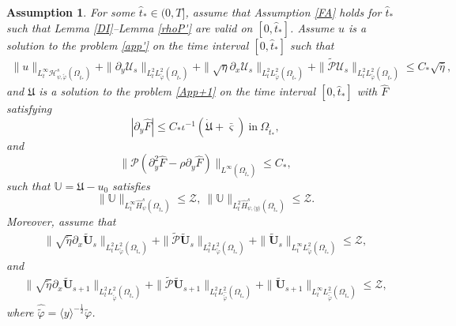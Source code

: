\documentclass[10pt,a4paper]{amsart}
\newtheorem{assumption}{Assumption}
\newcommand\y{{{\langle y \rangle}}}
\begin{document}
\begin{assumption}\label{peA}
For some $\hat{t}_{*}\in(0,T]$, assume that
Assumption \ref{FA} holds for $\hat{t}_{*}$ such that  Lemma \ref{DI}--Lemma \ref{rhoP'} are valid on $[0,\hat{t}_{*}]$. Assume $u$ is a solution to the problem \eqref{app'} on the time interval $[0,\hat{t}_{*}]$ such that
\begin{align*}
 \|u\|_{L_{t}^{\infty}\mathcal{H}_{\psi,\tilde{\varphi}}^{s}(\Omega_{\hat{t}_{*}})}
+\|\partial_{y}\mathcal{U}_{s}\|_{L_{t}^{2}L_{\tilde{\varphi}}^{2}(\Omega_{\hat{t}_{*}})}
+\|\sqrt{\eta}\partial_{x}\mathcal{U}_{s}\|_{L_{t}^{2}L_{\tilde{\varphi}}^{2}(\Omega_{\hat{t}_{*}})}
+\|\tilde{\mathcal{P}}\mathcal{U}_{s}\|_{L_{t}^{2}L_{\tilde{\varphi}}^{2}(\Omega_{\hat{t}_{*}})}
\leq C_{*}\sqrt{\bar{\eta}},
\end{align*}
and $\mathfrak{U}$ is a solution to the problem \eqref{App+1} on the time interval $[0,\hat{t}_{*}]$ with $\hat{F}$ satisfying
$$|\partial_{y}\hat{F}|\leq C_{*}\iota^{-1}(\dot{\mathfrak{U}}+\bar{\varsigma})~\text{in}~\Omega_{\hat{t}_{*}},$$
and
$$\|\mathcal{P}(\partial_{y}^{2}\hat{F}-\rho\partial_{y}\hat{F})\|_{L^{\infty}(\Omega_{\hat{t}_{*}})}\leq C_{*},$$
such that $\mathbb{U}=\mathfrak{U}-u_{0}$ satisfies
$$\|\mathbb{U}\|_{L_{t}^{\infty}\hat{H}_{\psi}^{s}(\Omega_{\hat{t}_{*}})}\leq \mathcal{Z},
~\|\mathbb{U}\|_{L_{t}^{2}\hat{H}_{\psi,\y}^{s}(\Omega_{\hat{t}_{*}})}\leq \mathcal{Z}.$$
Moreover, assume that
\begin{align*}
 \|\sqrt{\tilde{\eta}}\partial_{x}\tilde{\mathbf{U}}_{s}\|_{L_{t}^{2}L_{\tilde{\varphi}}^{2}(\Omega_{\hat{t}_{*}})}
+\|\tilde{\mathcal{P}}\tilde{\mathbf{U}}_{s}\|_{L_{t}^{2}L_{\tilde{\varphi}}^{2}(\Omega_{\hat{t}_{*}})}
+\|\tilde{\mathbf{U}}_{s}\|_{L_{t}^{\infty}L_{\tilde{\varphi}}^{2}(\Omega_{\hat{t}_{*}})}
\leq \mathcal{Z},
\end{align*}
and
\begin{align*}
 \|\sqrt{\tilde{\eta}}\partial_{x}\tilde{\mathbf{U}}_{s+1}\|_{L_{t}^{2}L_{\hat{\tilde{\varphi}}}^{2}(\Omega_{\hat{t}_{*}})}
+\|\tilde{\mathcal{P}}\tilde{\mathbf{U}}_{s+1}\|_{L_{t}^{2}L_{\hat{\tilde{\varphi}}}^{2}(\Omega_{\hat{t}_{*}})}
+\|\tilde{\mathbf{U}}_{s+1}\|_{L_{t}^{\infty}L_{\hat{\tilde{\varphi}}}^{2}(\Omega_{\hat{t}_{*}})}
\leq \mathcal{Z},
\end{align*}
where $\hat{\tilde{\varphi}}=\y^{-\frac{1}{2}}\tilde{\varphi}$.
\end{assumption}
\end{document}
